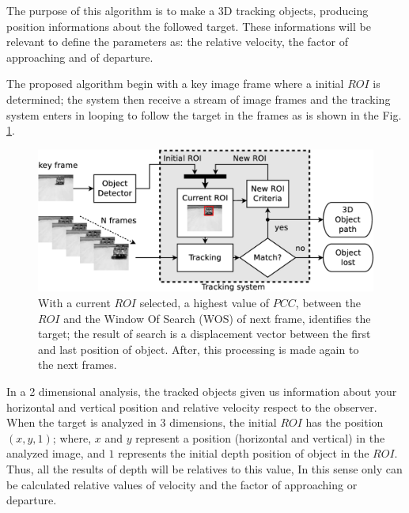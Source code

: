 The purpose of this algorithm is to make a 3D tracking objects, producing position informations 
about the followed target.
These informations will be relevant to define the parameters 
as: the relative velocity, the factor of approaching and of departure.

The proposed algorithm begin with a key image frame where a initial $ROI$ is determined; 
the system then receive a stream of image frames and the tracking system 
enters in looping to follow the target in the frames as is shown in the Fig. \ref{fig:system}.


\begin{figure}[bhp]
\includegraphics[width=\columnwidth]{images/figure1-diagram1.eps}
\caption{With a current $ROI$ selected, a highest value of $PCC$, between the $ROI$ 
and the Window Of Search (WOS) of next frame, identifies the target; 
the result of search is a displacement vector
between the first and last position of object. 
After, this processing is made again to the next frames.}
\label{fig:system}
\end{figure}

In a 2 dimensional analysis, the tracked objects given us information about your horizontal 
and vertical position and relative velocity respect to the observer.
When the target is analyzed in 3 dimensions, 
the initial $ROI$ has the position $(x,y,1)$;
where, $x$ and $y$ represent a position (horizontal and vertical) in the analyzed image,
and $1$ represents the initial depth position of object in the $ROI$.
Thus, all the results of depth will be relatives to this value, 
In this sense only can be calculated relative values of
velocity and the factor of approaching or departure. 

